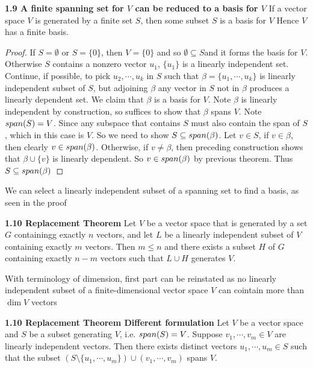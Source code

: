 \documentclass[11pt]{article}
\begin{document}
\begin{theorem*}
    \textbf{1.9 A finite spanning set for $V$ can be reduced to a basis for $V$} If a vector space $V$ is generated by a finite set $S$, then some subset $S$ is a basis for $V$ Hence $V$ has a finite basis. 
    \begin{proof}
        If $S=\emptyset$ or $S = \{ 0\}$, then $V = \{0\}$ and so $\emptyset \subseteq S$and it forms the basis for $V$. Otherwise $S$ contains a nonzero vector $u_1$, $\{u_1\}$ is a linearly independent set. Continue, if possible, to pick $u_2,\cdots, u_k$ in $S$ such that $\beta=\{u_1, \cdots, u_k\}$ is linearly independent subset of $S$, but adjoining $\beta$ any vector in $S$ not in $\beta$ produces a linearly dependent set. We claim that $\beta$ is a basis for $V$. Note $\beta$ is linearly independent by construction, so suffices to show that $\beta$ spans $V$. Note $span(S) = V$. Since any subspace that contains $S$ must also contain the span of $S$, which in this case is $V$. So we need to show $S\subseteq span(\beta)$. Let $v\in S$, if $v\in \beta$, then clearly $v\in span(\beta)$. Otherwise, if $v\neq \beta$, then preceding construction shows that $\beta \cup \{v\}$ is linearly dependent. So $v\in span(\beta)$ by previous theorem. Thus $S\subseteq span(\beta)$ 
    \end{proof}
    We can select a linearly independent subset of a spanning set to find a basis, as seen in the proof
\end{theorem*}


\begin{theorem*}
    \textbf{1.10 Replacement Theorem} Let $V$ be a vector space that is generated by a set $G$ containingg exactly $n$ vectors, and let $L$ be a linearly independent subset of $V$ containing exactly $m$ vectors. Then $m\leq n$  and there exists a subset $H$ of $G$ containing exactly $n-m$ vectors such that $L\cup H$ generates $V$. 
    \begin{rem}
        With terminology of dimension, first part can be reinstated as no linearly independent subset of a finite-dimensional vector space $V$ can cointain more than $\dim{V}$ vectors
    \end{rem}
\end{theorem*}

\begin{theorem*}
    \textbf{1.10 Replacement Theorem Different formulation} Let $V$ be a vector space and $S$ be a subset generating $V$, i.e. $span(S)=V$. Suppose $v_1, \cdots, v_m \in V$ are linearly independent vectors. Then there exists distinct vectors $u_1,\cdots, u_m\in S$ such that the subset $(S\setminus \{u_1,\cdots, u_m\}) \cup (v_1,\cdots, v_m)$ spans $V$. 
\end{theorem*}
    
\end{document}
